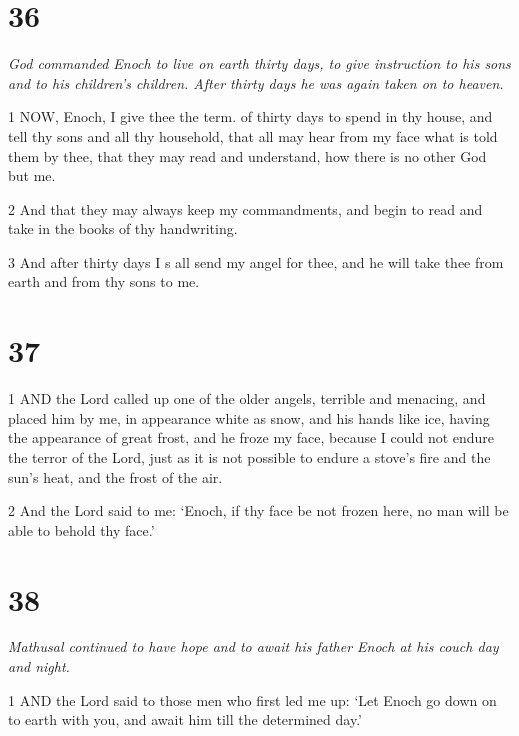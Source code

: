 \chapter{36}

\par \textit{God commanded Enoch to live on earth thirty days, to give instruction to his sons and to his children's children. After thirty days he was again taken on to heaven.}

\par 1 NOW, Enoch, I give thee the term. of thirty days to spend in thy house, and tell thy sons and all thy household, that all may hear from my face what is told them by thee, that they may read and understand, how there is no other God but me.

\par 2 And that they may always keep my commandments, and begin to read and take in the books of thy handwriting.

\par 3 And after thirty days I s all send my angel for thee, and he will take thee from earth and from thy sons to me.

\chapter{37}

\par 1 AND the Lord called up one of the older angels, terrible and menacing, and placed him by me, in appearance white as snow, and his hands like ice, having the appearance of great frost, and he froze my face, because I could not endure the terror of the Lord, just as it is not possible to endure a stove's fire and the sun's heat, and the frost of the air.

\par 2 And the Lord said to me: ‘Enoch, if thy face be not frozen here, no man will be able to behold thy face.’

\chapter{38}

\par \textit{Mathusal continued to have hope and to await his father Enoch at his couch day and night.}

\par 1 AND the Lord said to those men who first led me up: ‘Let Enoch go down on to earth with you, and await him till the determined day.’

